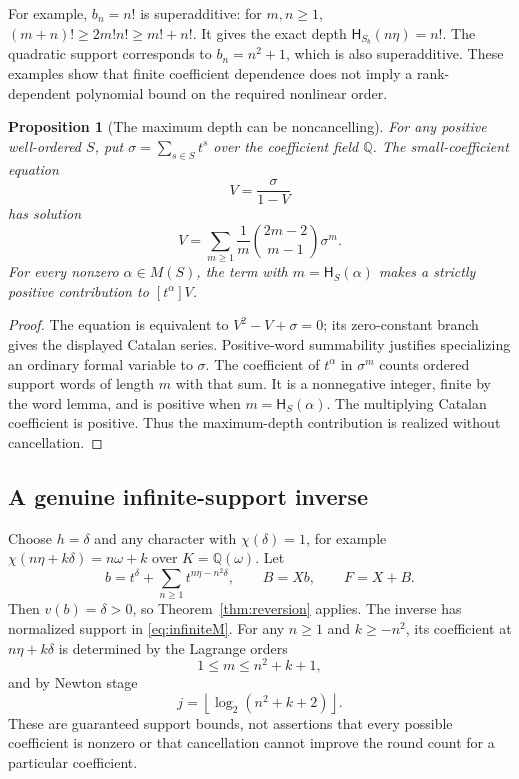 \documentclass[11pt,a4paper]{article}
\newtheorem{proposition}[theorem]{Proposition}
\theoremstyle{definition}
\theoremstyle{remark}
\newcommand{\Q}{\mathbb Q}
\newcommand{\depth}{\mathsf H}
\newcommand{\coef}[1]{\left[#1\right]}
\begin{document}
For example, $b_n=n!$ is superadditive: for $m,n\ge1$,
$(m+n)!\ge2m!n!\ge m!+n!$. It gives the exact depth
$\depth_{S_b}(n\eta)=n!$. The quadratic support corresponds to
$b_n=n^2+1$, which is also superadditive. These examples show that finite
coefficient dependence does not imply a rank-dependent polynomial bound
on the required nonlinear order.

\begin{proposition}[The maximum depth can be noncancelling]
\label{prop:noncancelling}
For any positive well-ordered $S$, put
$\sigma=\sum_{s\in S}t^s$ over the coefficient field $\Q$.
The small-coefficient equation
\[
 V=\frac{\sigma}{1-V}
\]
has solution
\[
 V=\sum_{m\ge1}\frac1m\binom{2m-2}{m-1}\sigma^m.
\]
For every nonzero $\alpha\in M(S)$, the term with
$m=\depth_S(\alpha)$ makes a strictly positive contribution to
$\coef{t^\alpha}V$.
\end{proposition}
\begin{proof}
The equation is equivalent to $V^2-V+\sigma=0$; its zero-constant branch
gives the displayed Catalan series. Positive-word summability justifies
specializing an ordinary formal variable to $\sigma$.
The coefficient of $t^\alpha$ in $\sigma^m$ counts ordered support words
of length $m$ with that sum. It is a nonnegative integer, finite by the
word lemma, and is positive when $m=\depth_S(\alpha)$. The multiplying
Catalan coefficient is positive. Thus the maximum-depth contribution is
realized without cancellation.
\end{proof}

\subsection{A genuine infinite-support inverse}
Choose $h=\delta$ and any character with $\chi(\delta)=1$, for example
$\chi(n\eta+k\delta)=n\omega+k$ over $K=\Q(\omega)$. Let
\begin{equation}\label{eq:infiniteB}
 b=t^\delta+\sum_{n\ge1}t^{n\eta-n^2\delta},\qquad
 B=Xb,
 \qquad F=X+B.
\end{equation}
Then $v(b)=\delta>0$, so Theorem~\ref{thm:reversion} applies. The inverse
has normalized support in \eqref{eq:infiniteM}. For any $n\ge1$ and
$k\ge-n^2$, its coefficient at $n\eta+k\delta$ is determined by the
Lagrange orders
\[
 1\le m\le n^2+k+1,
\]
and by Newton stage
\begin{equation}\label{eq:infiniteRounds}
 j=\left\lfloor\log_2(n^2+k+2)\right\rfloor.
\end{equation}
These are guaranteed support bounds, not assertions that every possible
coefficient is nonzero or that cancellation cannot improve the round count
for a particular coefficient.
\end{document}
